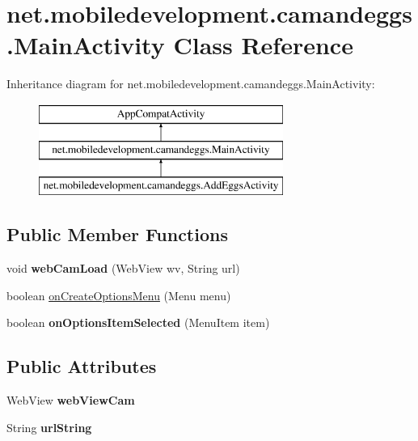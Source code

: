 \hypertarget{classnet_1_1mobiledevelopment_1_1camandeggs_1_1_main_activity}{}\section{net.\+mobiledevelopment.\+camandeggs.\+Main\+Activity Class Reference}
\label{classnet_1_1mobiledevelopment_1_1camandeggs_1_1_main_activity}
Inheritance diagram for net.\+mobiledevelopment.\+camandeggs.\+Main\+Activity\+:\begin{figure}[H]
\begin{center}
\leavevmode
\includegraphics[height=3.000000cm]{classnet_1_1mobiledevelopment_1_1camandeggs_1_1_main_activity}
\end{center}
\end{figure}
\subsection*{Public Member Functions}
\begin{DoxyCompactItemize}
\item 
\mbox{\label{classnet_1_1mobiledevelopment_1_1camandeggs_1_1_main_activity_ab3d2937015b4acf291bbc0c2703a6410}} 
void {\bfseries web\+Cam\+Load} (Web\+View wv, String url)
\item 
boolean \hyperlink{classnet_1_1mobiledevelopment_1_1camandeggs_1_1_main_activity_ab170f26993d4cca2a6932e5d7e780155}{on\+Create\+Options\+Menu} (Menu menu)
\item 
\mbox{\label{classnet_1_1mobiledevelopment_1_1camandeggs_1_1_main_activity_ac718827b27f95f142684757a8087f2de}} 
boolean {\bfseries on\+Options\+Item\+Selected} (Menu\+Item item)
\end{DoxyCompactItemize}
\subsection*{Public Attributes}
\begin{DoxyCompactItemize}
\item 
\mbox{\label{classnet_1_1mobiledevelopment_1_1camandeggs_1_1_main_activity_a97160c3eb4058966248714309ec8a36a}} 
Web\+View {\bfseries web\+View\+Cam}
\item 
\mbox{\label{classnet_1_1mobiledevelopment_1_1camandeggs_1_1_main_activity_adb85cb0ddaf038354e363e57a4738011}} 
String {\bfseries url\+String}
\end{DoxyCompactItemize}
